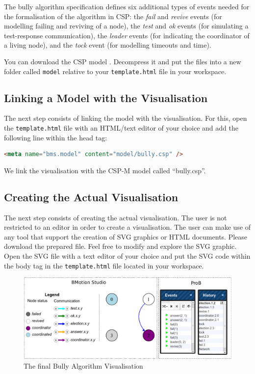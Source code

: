 The bully algorithm specification defines six additional types of events needed for the formalisation of the algorithm in CSP:
the \textit{fail} and \textit{revive} events (for modelling failing and reviving of a node), the \textit{test} and \textit{ok} events (for simulating a test-response communication), the \textit{leader} events (for indicating the coordinator of a living node), and the \textit{tock} event (for modelling timeouts and time).

You can download the CSP model .
Decompress it and put the files into a new folder called \texttt{model} relative to your \texttt{template.html} file in your workspace.

\subsection{Linking a Model with the Visualisation}

The next step consists of linking the model with the visualisation.
For this, open the \texttt{template.html} file with an HTML/text editor of your choice and add the following line within the head tag:

\begin{lstlisting}[language=html]
<meta name="bms.model" content="model/bully.csp" />
\end{lstlisting}

We link the visualisation with the CSP-M model called ``bully.csp''.

\subsection{Creating the Actual Visualisation}
\label{tutorial_csp_create_vis}

The next step consists of creating the actual visualisation.
The user is not restricted to an editor in order to create a visualisation.
The user can make use of any tool that support the creation of SVG graphics or HTML documents.
Please download the prepared  file.
Feel free to modify and explore the SVG graphic.
Open the SVG file with a text editor of your choice and put the SVG code within the body tag in the \texttt{template.html} file located in your workspace.

\begin{figure}[h!]\centering
	\includegraphics[width=\textwidth]{img/tutorial/runningvis}
	\caption{The final Bully Algorithm Visualisation}
	\label{fig:BullyVisState}
\end{figure}

